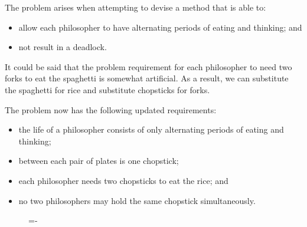 \documentclass[a4paper]{systems-software}
\begin{document}
The problem arises when attempting to devise a method that is able to:
\begin{itemize}
	\item allow each philosopher to have alternating periods of eating and thinking; and
	\item not result in a deadlock.
\end{itemize}

It could be said that the problem requirement for each philosopher to need two forks to eat the spaghetti is somewhat artificial. As a result, we can substitute the spaghetti for rice and substitute chopsticks for forks.

The problem now has the following updated requirements:
\begin{itemize}
	\item the life of a philosopher consists of only alternating periods of eating and thinking;
	\item between each pair of plates is one chopstick;
	\item each philosopher needs two chopsticks to eat the rice; and
	\item no two philosophers may hold the same chopstick simultaneously.
\end{itemize}

\begin{figure}[H]
  \lineskip=-\fboxrule
\end{figure}
\end{document}
